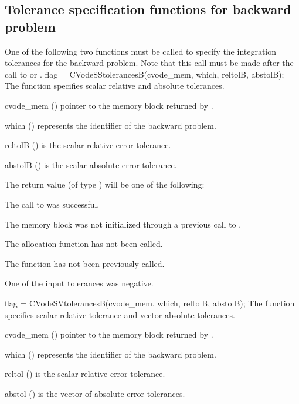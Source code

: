 \subsection{Tolerance specification functions for backward problem}
\label{sss:cvtolerances_b}
One of the following two functions must be called to specify the integration 
tolerances for the backward problem. Note that this call must be made after the 
call to  or .
{
  flag = CVodeSStolerancesB(cvode\_mem, which, reltolB, abstolB);
}
{
  The function  specifies scalar relative and absolute
  tolerances.
}
{
  \begin{args}
  \item[cvode\_mem] ()
    pointer to the {\cvodes} memory block returned by .
  \item[which] ()
    represents the identifier of the backward problem.
  \item[reltolB] ()
    is the scalar relative error tolerance.
  \item[abstolB] ()
    is the scalar absolute error tolerance.
  \end{args}
}
{
  The return value  (of type ) will be one of the following:
  \begin{args}
  \item[\Id{CV\_SUCCESS}]
    The call to  was successful.
  \item[\Id{CV\_MEM\_NULL}] 
    The {\cvodes} memory block was not initialized through a previous call to
    .
  \item[\Id{CV\_NO\_MALLOC}] 
    The allocation function  has not been called.
  \item[\Id{CV\_NO\_ADJ}]
    The function  has not been previously called.
  \item[\Id{CV\_ILL\_INPUT}] 
    One of the input tolerances was negative.
  \end{args}
}
{}
{
  flag = CVodeSVtolerancesB(cvode\_mem, which, reltolB, abstolB);
}
{
  The function  specifies scalar relative tolerance and
  vector absolute tolerances.
}
{
  \begin{args}
  \item[cvode\_mem] ()
    pointer to the {\cvodes} memory block returned by .
  \item[which] ()
    represents the identifier of the backward problem.
  \item[reltol] ()
    is the scalar relative error tolerance.
  \item[abstol] ()
    is the vector of absolute error tolerances.
  \end{args}
}
